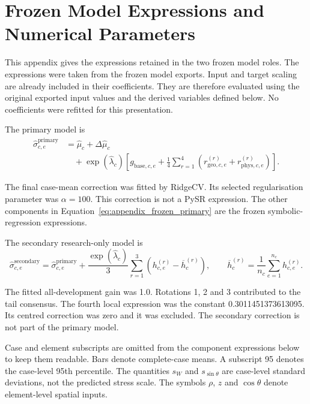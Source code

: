 \clearpage
\section{Frozen Model Expressions and Numerical Parameters}
\label{app:frozen_model_expressions}

This appendix gives the expressions retained in the two frozen model roles. The expressions were taken from the frozen model exports. Input and target scaling are already included in their coefficients. They are therefore evaluated using the original exported input values and the derived variables defined below. No coefficients were refitted for this presentation.

The primary model is
\begin{equation}
\begin{aligned}
\widehat{\sigma}^{\mathrm{primary}}_{c,e}
&=\widehat{\mu}_{c}+\Delta\widehat{\mu}_{c}\\
&\quad+\exp(\widehat{\lambda}_{c})
\left[g_{\mathrm{base},c,e}+\frac14\sum_{r=1}^{4}
\left(r^{(r)}_{\mathrm{geo},c,e}+r^{(r)}_{\mathrm{phys},c,e}\right)\right].
\end{aligned}
\label{eq:appendix_frozen_primary}
\end{equation}

The final case-mean correction was fitted by RidgeCV. Its selected regularisation parameter was $\alpha=100$. This correction is not a PySR expression. The other components in Equation~\ref{eq:appendix_frozen_primary} are the frozen symbolic-regression expressions.

The secondary research-only model is
\begin{equation}
\widehat{\sigma}^{\mathrm{secondary}}_{c,e}
=\widehat{\sigma}^{\mathrm{primary}}_{c,e}
+\frac{\exp(\widehat{\lambda}_{c})}{3}
\sum_{r=1}^{3}\left(h^{(r)}_{c,e}-\overline{h}^{(r)}_c\right),
\qquad
\overline{h}^{(r)}_c=\frac1{n_c}\sum_{e=1}^{n_c}h^{(r)}_{c,e}.
\label{eq:appendix_frozen_secondary}
\end{equation}

The fitted all-development gain was 1.0. Rotations 1, 2 and 3 contributed to the tail consensus. The fourth local expression was the constant 0.3011451373613095. Its centred correction was zero and it was excluded. The secondary correction is not part of the primary model.

Case and element subscripts are omitted from the component expressions below to keep them readable. Bars denote complete-case means. A subscript 95 denotes the case-level 95th percentile. The quantities $s_W$ and $s_{\sin\theta}$ are case-level standard deviations, not the predicted stress scale. The symbols $\rho$, $z$ and $\cos\theta$ denote element-level spatial inputs.

